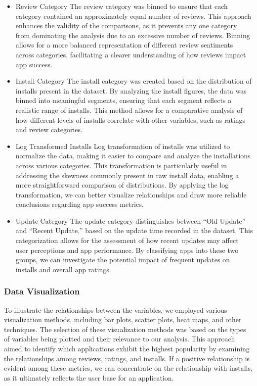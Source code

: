 \documentclass[
]{article}
\begin{document}
\begin{itemize}
\item
  Review Category The review category was binned to ensure that each
  category contained an approximately equal number of reviews. This
  approach enhances the validity of the comparisons, as it prevents any
  one category from dominating the analysis due to an excessive number
  of reviews. Binning allows for a more balanced representation of
  different review sentiments across categories, facilitating a clearer
  understanding of how reviews impact app success.
\item
  Install Category The install category was created based on the
  distribution of installs present in the dataset. By analyzing the
  install figures, the data was binned into meaningful segments,
  ensuring that each segment reflects a realistic range of installs.
  This method allows for a comparative analysis of how different levels
  of installs correlate with other variables, such as ratings and review
  categories.
\item
  Log Transformed Installs Log transformation of installs was utilized
  to normalize the data, making it easier to compare and analyze the
  installations across various categories. This transformation is
  particularly useful in addressing the skewness commonly present in raw
  install data, enabling a more straightforward comparison of
  distributions. By applying the log transformation, we can better
  visualize relationships and draw more reliable conclusions regarding
  app success metrics.
\item
  Update Category The update category distinguishes between ``Old
  Update'' and ``Recent Update,'' based on the update time recorded in
  the dataset. This categorization allows for the assessment of how
  recent updates may affect user perceptions and app performance. By
  classifying apps into these two groups, we can investigate the
  potential impact of frequent updates on installs and overall app
  ratings.
\end{itemize}

\subsubsection{Data Visualization}\label{data-visualization}

To illustrate the relationships between the variables, we employed
various visualization methods, including bar plots, scatter plots, heat
maps, and other techniques. The selection of these visualization methods
was based on the types of variables being plotted and their relevance to
our analysis. This approach aimed to identify which applications exhibit
the highest popularity by examining the relationships among reviews,
ratings, and installs. If a positive relationship is evident among these
metrics, we can concentrate on the relationship with installs, as it
ultimately reflects the user base for an application.
\end{document}
